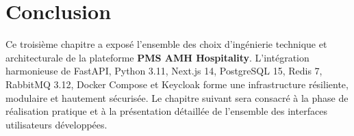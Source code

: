 \section{Conclusion}

Ce troisième chapitre a exposé l'ensemble des choix d'ingénierie technique et architecturale de la plateforme \textbf{PMS AMH Hospitality}. L'intégration harmonieuse de FastAPI, Python 3.11, Next.js 14, PostgreSQL 15, Redis 7, RabbitMQ 3.12, Docker Compose et Keycloak forme une infrastructure résiliente, modulaire et hautement sécurisée. Le chapitre suivant sera consacré à la phase de réalisation pratique et à la présentation détaillée de l'ensemble des interfaces utilisateurs développées.
